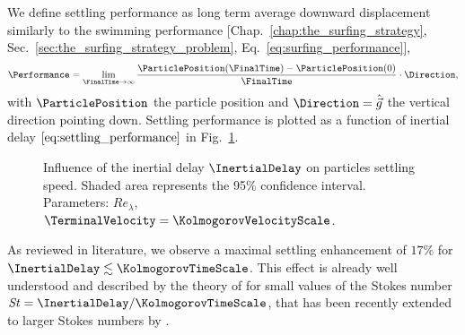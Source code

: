 We define settling performance as long term average downward displacement similarly to the swimming performance [Chap.~\ref{chap:the_surfing_strategy}, Sec.~\ref{sec:the_surfing_strategy_problem}, Eq.~\eqref{eq:surfing_performance}],
\begin{equation}
	\label{eq:settling_performance}
	\Performance = \lim_{\FinalTime\to\infty} \frac{\ParticlePosition (\FinalTime) - \ParticlePosition (0)}{\FinalTime} \cdot \Direction,
\end{equation}
with $\ParticlePosition$ the particle position and $\Direction = \hat{\vec{g}}$ the vertical direction pointing down.
Settling performance is plotted as a function of inertial delay $\ref{eq:settling_performance}$ in Fig.~\ref{fig:passive_inertial_delay}.
\begin{figure}%
	\centering
	
	\caption{
		Influence of the inertial delay $\InertialDelay$ on particles settling speed.
		Shaded area represents the 95\% confidence interval.
		Parameters: $\mathit{Re}_{\lambda}$, $\TerminalVelocity = \KolmogorovVelocityScale$.
	}
	\label{fig:passive_inertial_delay}
\end{figure}
As reviewed in literature, we observe a maximal settling enhancement of $17\%$ for $\InertialDelay \lesssim \KolmogorovTimeScale$.
This effect is already well understood and described by the theory of \citep{maxey1987gravitational} for small values of the Stokes number $\mathit{St} = \InertialDelay / \KolmogorovTimeScale$, that has been recently extended to larger Stokes numbers by \citep{tom2019multiscale}.

